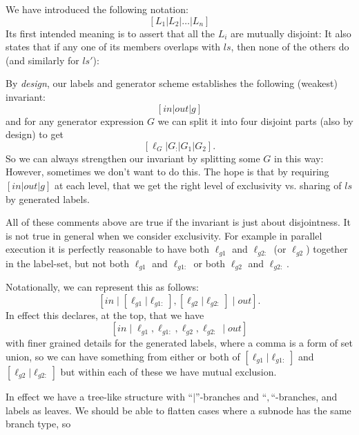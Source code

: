 \newpage
{}

We have introduced the following notation:
\[
  [ L_1 | L_2 | \dots | L_n ]
\]
Its first intended meaning is to assert that
all the $L_i$ are mutually disjoint:
It also states that if any one of its members overlaps with $ls$,
then none of the others do (and similarly for $ls'$):

By \emph{design}, our labels and generator scheme
establishes the following (weakest) invariant:
\[ [in|out|g]\]
and for any generator expression $G$ we can split it into
four disjoint parts (also by design) to get
\[  [\ell_G|G_{:}|G_1|G_2] . \]
So we can always strengthen our invariant by splitting some $G$
in this way:
However, sometimes we don't want to do this.
The hope is that by requiring $[in|out|g]$ at each level,
that we get the right level of exclusivity vs. sharing of $ls$
by generated labels.



All of these comments above are true if the invariant is just about disjointness.
It is not true in general when we consider exclusivity.
For example in parallel execution it is perfectly reasonable to have both
$\ell_{g1}$ and $\ell_{g2:}$ (or $\ell_{g2}$) together in the label-set,
but not both $\ell_{g1}$ and $\ell_{g1:}$
or both $\ell_{g2}$ and $\ell_{g2:}$.

Notationally, we can represent this as follows:
$$
[in \mid [\ell_{g1}|\ell_{g1:}],[\ell_{g2}|\ell_{g2:}] \mid out].
$$
In effect this declares, at the top, that we have
$$
[in \mid \ell_{g1},\ell_{g1:},\ell_{g2},\ell_{g2:} \mid out]
$$
with finer grained details for the generated labels,
where a comma is a form of set union,
so we can have something from
either or both of $[\ell_{g1}|\ell_{g1:}]$ and $[\ell_{g2}|\ell_{g2:}]$
but within each of these we have mutual exclusion.

In effect we have a tree-like structure with ``$|$''-branches
and ``$,$``-branches, and labels as leaves.
We should be able to flatten cases where a subnode has the same branch type,
so



